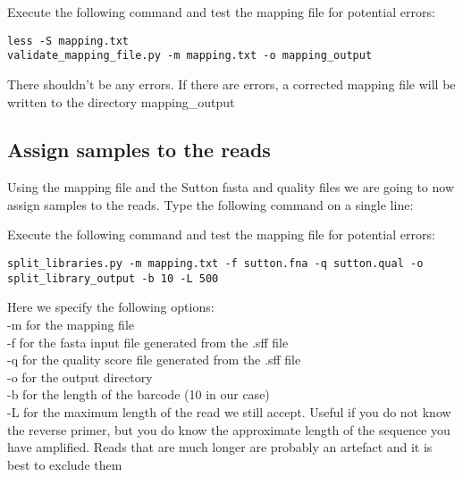 \begin{steps}
Execute the following command and test the mapping file for potential errors:
\begin{lstlisting}
less -S mapping.txt
validate_mapping_file.py -m mapping.txt -o mapping_output
\end{lstlisting}
\end{steps}

\begin{note}
There shouldn't be any errors. If there are errors, a corrected mapping file will be written to the directory mapping\_output
\end{note}

\subsection{Assign samples to the reads}

\begin{information}
Using the mapping file and the Sutton fasta and quality files we are going to now assign samples to the reads.
Type the following command on a single line:
\end{information}

\begin{steps}
Execute the following command and test the mapping file for potential errors:
\begin{lstlisting}
split_libraries.py -m mapping.txt -f sutton.fna -q sutton.qual -o split_library_output -b 10 -L 500
\end{lstlisting}
\end{steps}

\begin{information}
Here we specify the following options:\\
-m for the mapping file\\
-f for the fasta input file generated from the .sff file\\
-q for the quality score file generated from the .sff file\\
-o for the output directory\\
-b for the length of the barcode (10 in our case)\\
-L for the maximum length of the read we still accept. Useful if you do not know the reverse primer, but you do know the approximate length of the sequence you have amplified. Reads that are much longer are probably an artefact and it is best to exclude them\\
\end{information}

